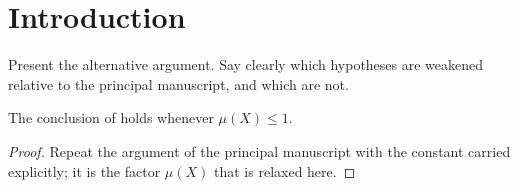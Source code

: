 
\section{Introduction}
\label{sec:introduction}

Present the alternative argument. Say clearly which hypotheses are
weakened relative to the principal manuscript, and which are not.

\begin{theorem}
\label{thm:alt}
The conclusion of \cite[Theorem 1.1]{principal} holds whenever
$\mu(X) \le 1$.
\end{theorem}

\begin{proof}
Repeat the argument of the principal manuscript with the constant
carried explicitly; it is the factor $\mu(X)$ that is relaxed here.
\end{proof}
